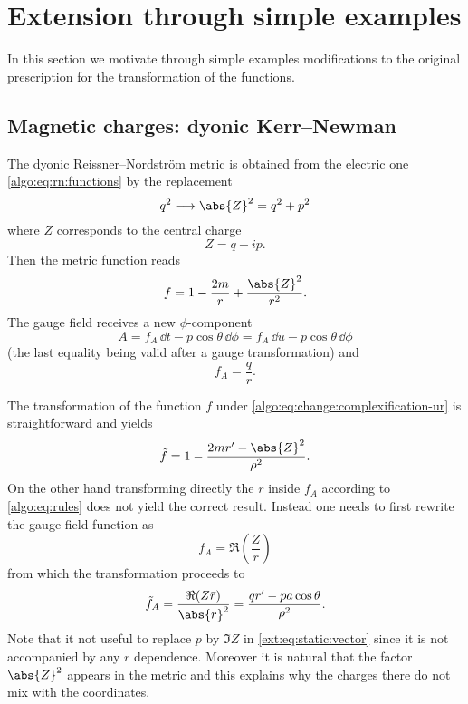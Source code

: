 \section{Extension through simple examples}
\label{sec:extension}


In this section we motivate through simple examples modifications to the original prescription for the transformation of the functions.


\subsection{Magnetic charges: dyonic Kerr--Newman}
\label{sec:extension:dyonic}


The dyonic Reissner--Nordström metric is obtained from the electric one \eqref{algo:eq:rn:functions} by the replacement~\cite[sec.~6.6]{Carroll:2004:SpacetimeGeometryIntroduction}
\begin{equation}
	q^2 \longrightarrow \abs{Z}^2 = q^2 + p^2
\end{equation} 
where $Z$ corresponds to the central charge
\begin{equation}
	Z = q + i p.
\end{equation} 
Then the metric function reads
\begin{equation}
	f = 1 - \frac{2m}{r} + \frac{\abs{Z}^2}{r^2}.
\end{equation} 
The gauge field receives a new $\phi$-component
\begin{equation}
	\label{ext:eq:static:vector}
	A = f_A\, \dd t - p \cos \theta\, \dd\phi
		= f_A\, \dd u - p \cos \theta\, \dd\phi
\end{equation}
(the last equality being valid after a gauge transformation) and
\begin{equation}
	f_A = \frac{q}{r}.
\end{equation} 

The transformation of the function $f$ under \eqref{algo:eq:change:complexification-ur} is straightforward and yields
\begin{equation}
	\tilde f = 1 - \frac{2m r' - \abs{Z}^2}{\rho^2}.
\end{equation} 
On the other hand transforming directly the $r$ inside $f_A$ according to \eqref{algo:eq:rules} does not yield the correct result.
Instead one needs to first rewrite the gauge field function as
\begin{equation}
	f_A = \Re\left(\frac{Z}{r}\right)
\end{equation} 
from which the transformation proceeds to
\begin{equation}
	\tilde f_A = \frac{\Re(Z \bar r)}{\abs{r}^2}
		= \frac{q r' - p a \cos \theta}{\rho^2}.
\end{equation} 
Note that it not useful to replace $p$ by $\Im Z$ in \eqref{ext:eq:static:vector} since it is not accompanied by any $r$ dependence.
Moreover it is natural that the factor $\abs{Z}^2$ appears in the metric and this explains why the charges there do not mix with the coordinates.

